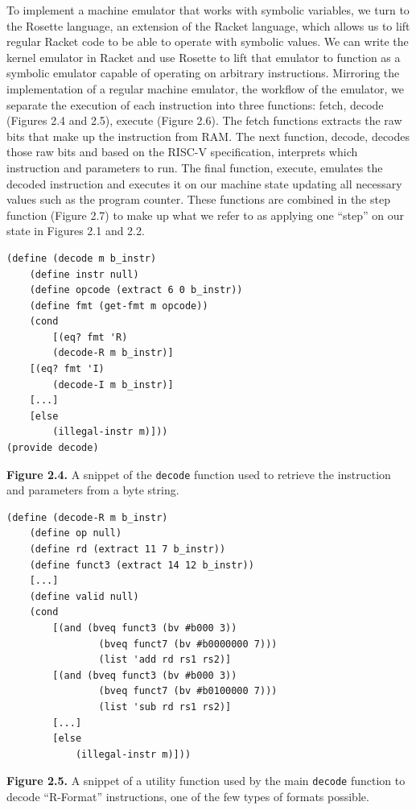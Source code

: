 \documentclass[]{article}
\begin{document}
To implement a machine emulator that works with symbolic variables, we
turn to the Rosette language, an extension of the Racket language, which
allows us to lift regular Racket code to be able to operate with
symbolic values. We can write the kernel emulator in Racket and use
Rosette to lift that emulator to function as a symbolic emulator capable
of operating on arbitrary instructions. Mirroring the implementation of
a regular machine emulator, the workflow of the emulator, we separate
the execution of each instruction into three functions: fetch, decode
(Figures 2.4 and 2.5), execute (Figure 2.6). The fetch functions
extracts the raw bits that make up the instruction from RAM. The next
function, decode, decodes those raw bits and based on the RISC-V
specification, interprets which instruction and parameters to run. The
final function, execute, emulates the decoded instruction and executes
it on our machine state updating all necessary values such as the
program counter. These functions are combined in the step function
(Figure 2.7) to make up what we refer to as applying one ``step'' on our
state in Figures 2.1 and 2.2.

\begin{verbatim}
(define (decode m b_instr)
    (define instr null)
    (define opcode (extract 6 0 b_instr))
    (define fmt (get-fmt m opcode))
    (cond
        [(eq? fmt 'R)
        (decode-R m b_instr)]
    [(eq? fmt 'I)
        (decode-I m b_instr)]
    [...]
    [else
        (illegal-instr m)]))
(provide decode)
\end{verbatim}

\textbf{Figure 2.4.} A snippet of the \texttt{decode} function used to
retrieve the instruction and parameters from a byte string.

\begin{verbatim}
(define (decode-R m b_instr)
    (define op null)
    (define rd (extract 11 7 b_instr))
    (define funct3 (extract 14 12 b_instr))
    [...]
    (define valid null)
    (cond
        [(and (bveq funct3 (bv #b000 3))
                (bveq funct7 (bv #b0000000 7)))
                (list 'add rd rs1 rs2)]
        [(and (bveq funct3 (bv #b000 3))
                (bveq funct7 (bv #b0100000 7)))
                (list 'sub rd rs1 rs2)]
        [...]
        [else
            (illegal-instr m)]))
\end{verbatim}

\textbf{Figure 2.5.} A snippet of a utility function used by the main
\texttt{decode} function to decode ``R-Format'' instructions, one of the
few types of formats possible.
\end{document}
